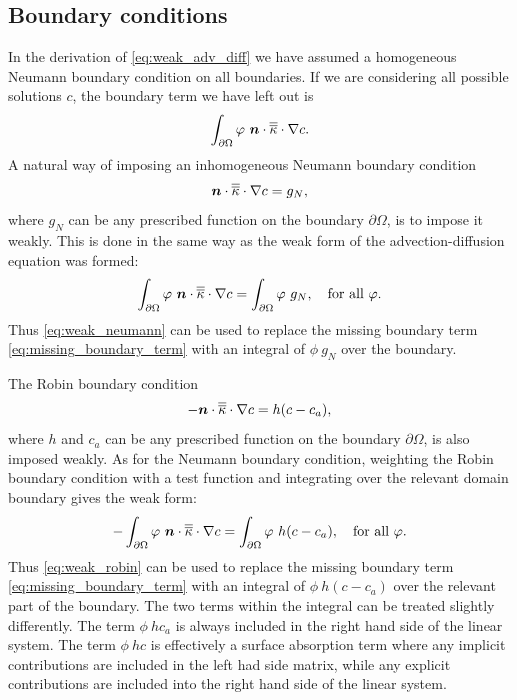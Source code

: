 \subsection{Boundary conditions}
In the derivation of \eqref{eq:weak_adv_diff} we have assumed a homogeneous Neumann
boundary condition on all boundaries. If we are considering all possible
solutions $c$, the boundary term we have left out is
\begin{equation}\label{eq:missing_boundary_term}
  \int_{\partial\Omega} \varphi~{\mbox{\boldmath$n$}}\cdot\overline{\overline{\kappa}}\cdot\nabla c.
\end{equation}
A natural way of imposing an inhomogeneous Neumann boundary condition
\begin{equation*}
  {\mbox{\boldmath$n$}}\cdot\overline{\overline{\kappa}}\cdot\nabla c=g_N,
\end{equation*}
where $g_N$ can be any prescribed function on the boundary $\partial\Omega$, is to impose it
weakly. This is done in the same way as the weak form of the advection-diffusion equation was formed:
\begin{equation}\label{eq:weak_neumann}
  \int_{\partial\Omega} \varphi~{\mbox{\boldmath$n$}}\cdot\overline{\overline{\kappa}}\cdot\nabla c=
    \int_{\partial\Omega} \varphi~g_N, \quad \text{for all }\varphi.
\end{equation}
Thus \eqref{eq:weak_neumann} can be used to replace the missing
boundary term \eqref{eq:missing_boundary_term} with an integral of $\phi~g_N$
over the boundary.

The Robin boundary condition
\begin{equation*}
  -{\mbox{\boldmath$n$}}\cdot\overline{\overline{\kappa}}\cdot\nabla c=h(c-c_{a}),
\end{equation*}
where $h$ and $c_{a}$ can be any prescribed function on the boundary $\partial\Omega$, is also imposed
weakly. As for the Neumann boundary condition, weighting the Robin boundary condition with a test function
and integrating over the relevant domain boundary gives the weak form:
\begin{equation}\label{eq:weak_robin}
  - \int_{\partial\Omega} \varphi~{\mbox{\boldmath$n$}}\cdot\overline{\overline{\kappa}}\cdot\nabla c=
    \int_{\partial\Omega} \varphi~h(c-c_{a}), \quad \text{for all }\varphi.
\end{equation}
Thus \eqref{eq:weak_robin} can be used to replace the missing
boundary term \eqref{eq:missing_boundary_term} with an integral of $\phi~h(c-c_{a})$
over the relevant part of the boundary. The two terms within the integral can be treated slightly differently.
The term $\phi~hc_{a}$ is always included in the right hand side of the linear system.
The term $\phi~hc$ is effectively a surface absorption term where any implicit contributions
are included in the left had side matrix, while any explicit contributions are included into the
right hand side of the linear system.

